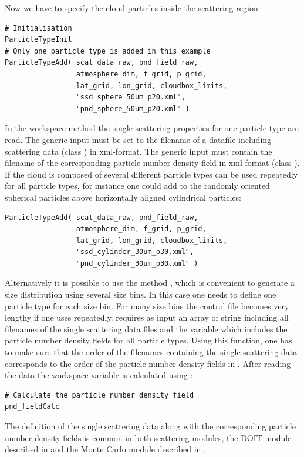 Now we have to specify the cloud particles inside the scattering
region:
\begin{verbatim}
# Initialisation
ParticleTypeInit
# Only one particle type is added in this example 
ParticleTypeAdd( scat_data_raw, pnd_field_raw,
                 atmosphere_dim, f_grid, p_grid,
                 lat_grid, lon_grid, cloudbox_limits,
                 "ssd_sphere_50um_p20.xml",
                 "pnd_sphere_50um_p20.xml" )
\end{verbatim}
In the workspace method  the single
scattering properties for one particle type are read. The
generic input  must be set to
the filename of a datafile including scattering data (class
) in xml-format. The generic input
 must contain the filename of the
corresponding particle number density field in xml-format (class
). If the cloud is composed of several
different particle types  can be used
repeatedly for all particle types, for instance one could add to the
randomly oriented spherical particles above horizontally aligned
cylindrical particles:
\begin{verbatim}
ParticleTypeAdd( scat_data_raw, pnd_field_raw,
                 atmosphere_dim, f_grid, p_grid,
                 lat_grid, lon_grid, cloudbox_limits,
                 "ssd_cylinder_30um_p30.xml",
                 "pnd_cylinder_30um_p30.xml" )
\end{verbatim}
Alternatively it is possible to use the method
, which is convenient to generate a size
distribution using several size bins. In this case one needs to define
one
particle type for each size bin. For many size bins the control file
becomes very lengthy if one uses 
repeatedly.  requires as input an array
of string including all filenames of the single scattering data files
and the variable  which includes the particle
number density fields for all particle types. Using this function, one
has to make sure that the order of the filenames containing the single
scattering data corresponds to the order of the particle number
density fields in .
After reading the data the workspace variable  is
calculated using : 
\begin{verbatim}
# Calculate the particle number density field
pnd_fieldCalc
\end{verbatim}

The definition of the single scattering data along with the
corresponding particle number density fields is common in both
scattering modules, the DOIT module described in 
 and the Monte Carlo module described in
.


